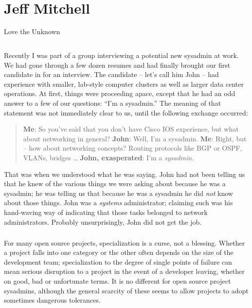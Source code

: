 
\chapter{Jeff Mitchell}{Love the Unknown}

\section*{}Recently I was part of a group interviewing a potential new sysadmin at
work. We had gone through a few dozen resumes and had finally brought our first
candidate in for an interview. The candidate -- let’s call him John -- had
experience with smaller, lab-style computer clusters as well as larger data
center operations. At first, things were proceeding apace, except that he had an
odd answer to a few of our questions: ``I’m a sysadmin.''
The meaning of that statement was not immediately clear to us, until the
following exchange occurred:
\begin{quote}
\textbf{Me}: So you’ve said that you don’t have Cisco IOS experience, but what about
networking in general?\newline
\textbf{John}: Well, I’m a sysadmin.\newline
\textbf{Me}: Right, but -- how about networking concepts? Routing protocols like BGP or
OSPF, VLANs, bridges \dots \newline
\textbf{John, exasperated}: I’m a \emph{sysadmin}.
\end{quote}
That was when we understood what he was saying. John had not been telling us that he knew
of the various things we were asking about because he was a sysadmin; he was
telling us that because he was a sysadmin he did \emph{not} know about those things.
John was a \emph{systems} administrator; claiming such was his hand-waving way of
indicating that those tasks belonged to network administrators.
Probably unsurprisingly, John did not get the job.

\paragraph*{}For many open source projects, specialization is a curse, not a blessing.
Whether a project falls into one category or the other often depends on the size
of the development team; specialization to the degree of single points of
failure can mean serious disruption to a project in the event of a developer
leaving, whether on good, bad or unfortunate terms. It is no different for open
source project sysadmins, although the general scarcity of these seems to allow
projects to adopt sometimes dangerous tolerances.

